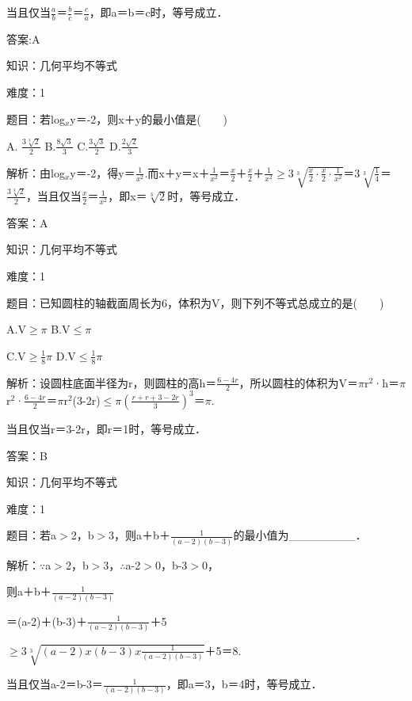 \documentclass{article} %
\begin{document}
当且仅当$\frac{a}{b}$＝$\frac{b}{c}$＝$\frac{c}{a}$，即a＝b＝c时，等号成立．

答案:A



知识：几何平均不等式

难度：1

题目：若log${}_{x}$y＝-2，则x＋y的最小值是(　　)

A. $\frac{3\sqrt[3]{2}}{2}$ B.$\frac{8\sqrt{3}}{3}$  C.$\frac{3\sqrt{3}}{2}$   D.$\frac{2\sqrt{2}}{3}$ 

解析：由log${}_{x}$y＝-2，得y＝$\frac{1}{x^2}$.而x＋y＝x＋$\frac{1}{x^2}$＝$\frac{x}{2}$＋$\frac{x}{2}$＋$\frac{1}{x^2}$$\mathrm{\ge}$3$\sqrt[3]{\frac{x}{2}\cdot\frac{x}{2}\cdot\frac{1}{x^2}}$＝$3\sqrt[3]{\frac{1}{4}}$＝$\frac{3\sqrt[3]{2}}{2}$，当且仅当$\frac{x}{2}$＝$\frac{1}{x^2}$，即x＝$\sqrt[3]{2}$时，等号成立．

答案：A



知识：几何平均不等式

难度：1

题目：已知圆柱的轴截面周长为6，体积为V，则下列不等式总成立的是(　　)

A.V$\mathrm{\ge}$$\pi$    B.V$\mathrm{\le}$$\pi$  

C.V$\mathrm{\ge}$$\frac{1}{8}\pi$    D.V$\mathrm{\le}$$\frac{1}{8}\pi$

解析：设圆柱底面半径为r，则圆柱的高h＝$\frac{6-4r}{2}$，所以圆柱的体积为V＝$\pi$r${}^{2}$·h＝$\pi$r${}^{2}$·$\frac{6-4r}{2}$＝$\pi$r${}^{2}$(3-2r)$\mathrm{\le}$$\pi$$(\frac{r+r+3-2r}{3})^3$＝$\pi$.

当且仅当r＝3-2r，即r＝1时，等号成立．

答案：B



知识：几何平均不等式

难度：1

题目：若a$\mathrm{>}$2，b$\mathrm{>}$3，则a＋b＋$\frac{1}{(a-2)(b-3)}$的最小值为\_\_\_\_\_\_\_\_．

解析：$\mathrm{\because}$a$\mathrm{>}$2，b$\mathrm{>}$3，$\mathrm{\therefore}$a-2$\mathrm{>}$0，b-3$\mathrm{>}$0，

则a＋b＋$\frac{1}{(a-2)(b-3)}$

＝(a-2)＋(b-3)＋$\frac{1}{(a-2)(b-3)}$＋5

$\mathrm{\ge}$3$\sqrt[3]{(a-2)x(b-3)x\frac{1}{(a-2)(b-3)}}$＋5＝8.

当且仅当a-2＝b-3＝$\frac{1}{(a-2)(b-3)}$，即a＝3，b＝4时，等号成立．
\end{document}
